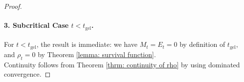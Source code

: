 \begin{proof}
\paragraph{3. Subcritical Case $t<t_\text{gel}$.} For $t<t_\text{gel}$, the result is immediate: we have $M_t=E_t=0$ by definition of $t_\text{gel}$, and $\rho_t=0$ by Theorem \ref{lemma: survival function}. \medskip \\ Continuity follows from Theorem \ref{thrm: continuity of rho} by using dominated convergence. \end{proof}


